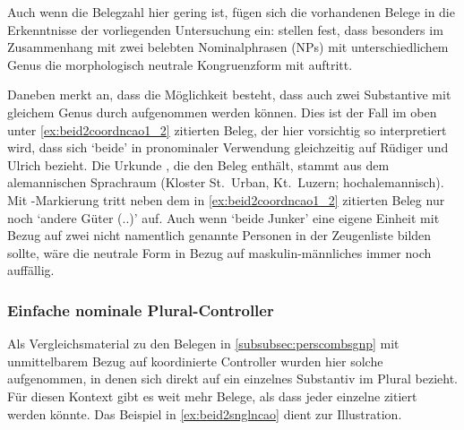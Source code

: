 Auch wenn die Belegzahl hier gering ist, fügen sich die vorhandenen Belege in
die Erkenntnisse der vorliegenden Untersuchung ein:
\textcites[39--40]{behaghel1928}[118]{dal2014} stellen fest, dass besonders im
Zusammenhang mit zwei belebten Nominalphrasen (NPs) mit unterschiedlichem Genus
die morphologisch neutrale Kongruenzform mit  auftritt.

\label{phsec:jungherren}
Daneben merkt \textcite[384]{paul2007} an, dass die Möglichkeit besteht, dass
auch zwei Substantive mit gleichem Genus durch
 aufgenommen werden können. Dies ist der Fall im oben unter
\cref{ex:beid2coordncao1_2} zitierten Beleg, der hier vorsichtig so
interpretiert wird, dass sich  `beide' in pronominaler Verwendung
gleichzeitig auf Rüdiger und Ulrich bezieht. Die Urkunde \citet[2915]{cao4},
die den Beleg enthält, stammt aus dem alemannischen Sprachraum (Kloster
St.~Urban, Kt.~Luzern; hochalemannisch). Mit
-Markierung tritt neben dem in \cref{ex:beid2coordncao1_2} zitierten
Beleg nur noch  `andere Güter (\Nom.\Pl.\NeutI)'
\autocite[\pno~2915, 213.27]{cao4} auf. Auch wenn 
`beide Junker' eine eigene Einheit mit Bezug auf zwei nicht namentlich
genannte Personen in der Zeugenliste bilden sollte, wäre die neutrale Form
 in Bezug auf maskulin-männliches  immer noch
auffällig.

\subsubsection{Einfache nominale Plural-Controller}
\label{subsubsec:persplnp}

Als Vergleichsmaterial zu den Belegen in \cref{subsubsec:perscombsgnp} mit
unmittelbarem Bezug auf koordinierte Controller wurden hier solche
aufgenommen, in denen sich  direkt auf ein einzelnes Substantiv im
Plural bezieht. Für diesen Kontext gibt es weit mehr Belege, als dass jeder
einzelne zitiert werden könnte. Das Beispiel in \cref{ex:beid2snglncao} dient
zur Illustration.

